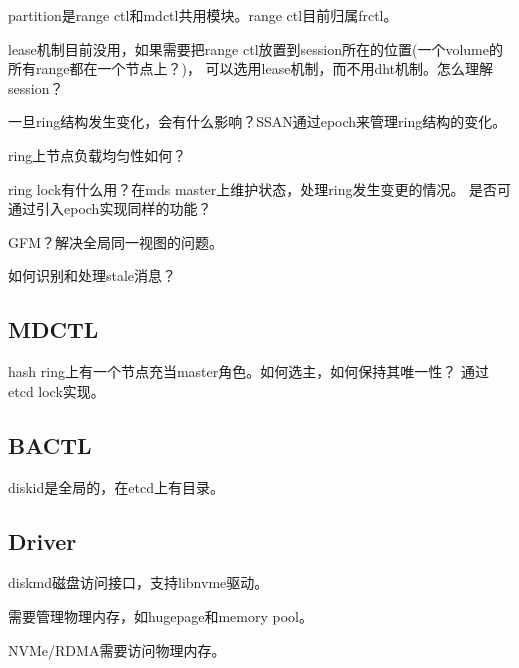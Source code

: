 partition是range ctl和mdctl共用模块。range ctl目前归属frctl。

lease机制目前没用，如果需要把range ctl放置到session所在的位置(一个volume的所有range都在一个节点上？)，
可以选用lease机制，而不用dht机制。怎么理解session？

一旦ring结构发生变化，会有什么影响？SSAN通过epoch来管理ring结构的变化。

ring上节点负载均匀性如何？

ring lock有什么用？在mds master上维护状态，处理ring发生变更的情况。
是否可通过引入epoch实现同样的功能？

GFM？解决全局同一视图的问题。

如何识别和处理stale消息？

\subsection{MDCTL}

hash ring上有一个节点充当master角色。如何选主，如何保持其唯一性？
通过etcd lock实现。

\subsection{BACTL}

diskid是全局的，在etcd上有目录。

\subsection{Driver}

diskmd磁盘访问接口，支持libnvme驱动。

需要管理物理内存，如hugepage和memory pool。

NVMe/RDMA需要访问物理内存。
